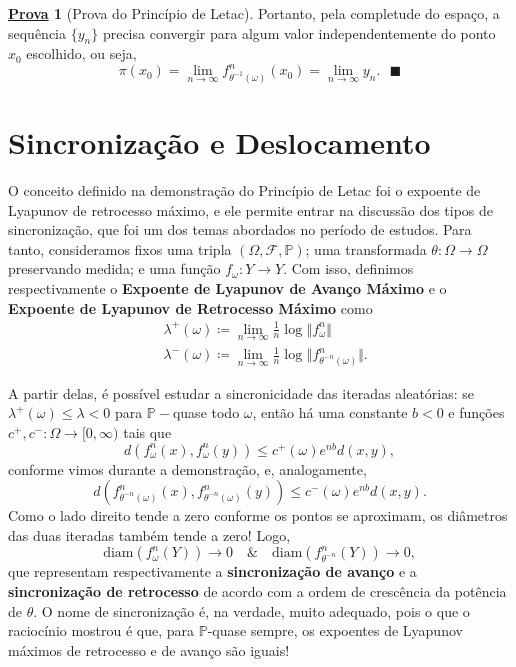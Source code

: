 \documentclass[12pt, a4paper]{article}
\theoremstyle{definition}
\newtheorem*{proof*}{\underline{Prova}}
\renewcommand\qedsymbol{$\blacksquare$}
\begin{document}
\begin{proof*} [Prova do Princípio de Letac]
	Portanto, pela completude do espaço, a sequência \(\{y_{n}\}\) precisa convergir para algum valor independentemente do ponto \(x_{0}\) escolhido, ou seja,
	\[
		\pi(x_{0})=\lim_{n\to \infty}f_{\theta^{-1}(\omega )}^{n}(x_{0})=\lim_{n\to \infty}y_{n}. \text{ \qedsymbol}
	\]

\end{proof*}

\section*{Sincronização e Deslocamento}
O conceito definido na demonstração do Princípio de Letac foi o expoente de Lyapunov de retrocesso máximo, e ele permite entrar na discussão dos tipos de sincronização, que foi um dos temas abordados no período de estudos.
Para tanto, consideramos fixos uma tripla \((\Omega , \mathcal{F}, \mathbb{P})\); uma transformada \(\theta :\Omega \rightarrow \Omega \) preservando medida; e uma função \(f_{\omega }:Y\rightarrow Y\). Com isso, definimos respectivamente o \textbf{Expoente de Lyapunov de Avanço Máximo} e o \textbf{Expoente de Lyapunov de Retrocesso Máximo} como
\begin{align*}
	 & \lambda^{+}(\omega )\coloneqq \lim_{n\to \infty}\frac{1}{n}\log^{}{\Vert f_{\omega }^{n} \Vert}               \\
	 & \lambda^{-}(\omega )\coloneqq \lim_{n\to \infty}\frac{1}{n}\log^{}{\Vert f_{\theta^{-n}(\omega )}^{n} \Vert}.
\end{align*}

A partir delas, é possível estudar a sincronicidade das iteradas aleatórias: se \(\lambda^{+}(\omega )\leq \lambda <0\) para \(\mathbb{P}-\)quase todo \(\omega \), então há uma constante \(b<0\) e funções \(c^{+}, c^{-}:\Omega \rightarrow [0, \infty)\) tais que
\[
	d(f_{\omega }^{n}(x), f_{\omega }^{n}(y))\leq c^{+}(\omega )e^{nb}d(x, y),
\]
conforme vimos durante a demonstração, e, analogamente,
\[
	d(f_{\theta^{-n}(\omega )}^{n}(x), f_{\theta^{-n}(\omega )}^{n}(y))\leq c^{-}(\omega )e^{nb}d(x, y).
\]
Como o lado direito tende a zero conforme os pontos se aproximam, os diâmetros das duas iteradas também tende a zero! Logo,
\[
	\mathrm{diam}(f_{\omega }^{n}(Y)) \rightarrow 0 \quad\&\quad \mathrm{diam}(f_{\theta^{-n}}^{n}(Y))\rightarrow 0,
\]
que representam respectivamente a \textbf{sincronização de avanço} e a \textbf{sincronização de retrocesso} de acordo com a ordem de crescência da potência de \(\theta \). O nome de sincronização é, na verdade, muito adequado, pois o que o raciocínio mostrou é que, para \(\mathbb{P}\)-quase sempre, os expoentes de Lyapunov máximos de retrocesso e de avanço são iguais!
\end{document}
